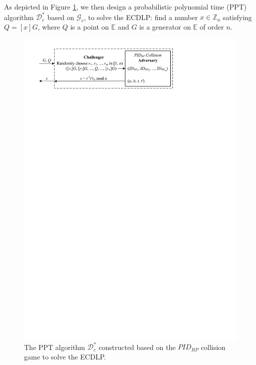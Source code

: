 As depicted in Figure \ref{fig:ecdlp_algorithm}, we then design a probabilistic polynomial time (PPT) algorithm $\mathcal{D}^*_c$ based on $\mathcal{G}_c$, to solve the ECDLP: find a number $x \in \mathbb{Z}_n$ satisfying $Q = [x]G$, where $Q$ is a point on $\mathbb{E}$ and $G$ is a generator on $\mathbb{E}$ of order $n$.


\begin{figure}[tb]
  \centering
  \includegraphics[width=0.96\linewidth]{fig/ecdlp_algorithm.pdf}
  \caption{The PPT algorithm $\mathcal{D}^*_c$ constructed based on the $PID_{RP}$ collision game to solve the ECDLP.}
  \label{fig:ecdlp_algorithm}
\end{figure}

